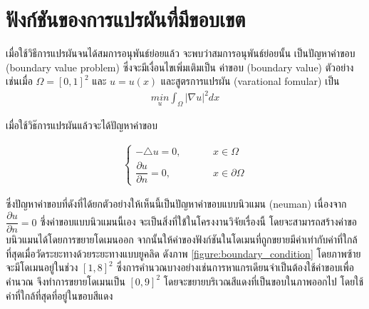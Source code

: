 \section{ฟังก์ชันของการแปรผันที่มีขอบเขต}

\hspace{1cm} เมื่อใช้วิธีการแปรผันจนได้สมการอนุพันธ์ย่อยแล้ว จะพบว่าสมการอนุพันธ์ย่อยนั้น เป็นปัญหาค่าขอบ (boundary value problem) ซึ่งจะมีเงื่อนไขเพิ่มเติมเป็น ค่าขอบ (boundary value) ตัวอย่างเช่นเมื่อ $\Omega = [0,1]^2$ และ $u=u(x)$ และสูตรการแปรผัน (varational fomular) เป็น 
\begin{align*}
    \underset{u}{{min}} \int_{\Omega} |\nabla u |^2 dx
\end{align*}

เมื่อใช้วิธ๊การแปรผันแล้วจะได้ปัญหาค่าขอบ

\begin{align*}
\left \{ \begin{array}{ll}  - \triangle u = 0,  & \hspace{1cm} x \in \Omega \\ \dfrac{\partial u}{\partial n} = 0, & \hspace{1cm} x \in \partial \Omega \end{array} \right .
\end{align*}

\hspace{1cm} ซึ่งปัญหาค่าขอบที่ดังที่ได้ยกตัวอย่างให้เห็นนี้เป็นปัญหาค่าขอบแบบนิวแมน (neuman) เนื่องจาก $\dfrac{\partial u}{\partial n} = 0$ ซึ่งค่าขอบแบบนิวแมนนี้เอง จะเป็นสิ่งที่ใช้ในโครงงานวิจัยเรื่องนี้ โดยจะสามารถสร้างค่าขอบนิวแมนได้โดยการขยายโดเมนออก จากนั้นให้ค่าของฟังก์ชันในโดเมนที่ถูกขยายมีค่าเท่ากับค่าที่ใกล้ที่สุดเมื่อวัดระยะทางด้วยระยะทางแบบยูคลิด ดังภาพ \ref{figure:boundary_condition} โดยภาพซ้ายจะมีโดเมนอยู่ในช่วง $[1,8]^2$ ซึ่งการคำนวณบางอย่างเช่นการหาแกรเดียนจำเป็นต้องใช้ค่าขอบเพื่อคำนวณ จึงทำการขยายโดเมนเป็น $[0,9]^2$ โดยจะขยายบริเวณสีแดงที่เป็นขอบในภาพออกไป โดยใช้ค่าที่ใกล้ที่สุดที่อยู่ในขอบสีแดง



